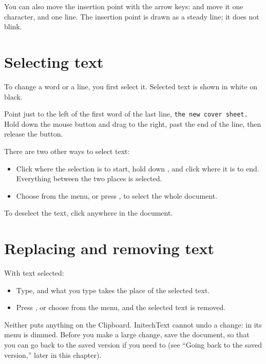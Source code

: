 
You can also move the insertion point with the arrow keys: 
and  move it one character,  and  one line.  The insertion point is drawn as a steady line; it does
not blink.

\section{Selecting text}
To change a word or a line, you first select it.  Selected text is shown
in white on black.
\begin{TaskSteps}
\Step Point just to the left of the first word of the last line,
\texttt{the new cover sheet.}
\Step Hold down the mouse button and drag to the right, past the end of the
line, then release the button.
\end{TaskSteps}


There are two other ways to select text:
\begin{itemize}
\item Click where the selection is to start, hold down , and
  click where it is to end.  Everything between the two places is
  selected.
\item Choose  from the  menu, or press
  , to select the whole document.
\end{itemize}
To deselect the text, click anywhere in the document.

\section{Replacing and removing text}
With text selected:
\begin{itemize}
\item Type, and what you type takes the place of the selected text.
\item Press , or choose  from the
   menu, and the selected text is removed.
\end{itemize}
Neither puts anything on the Clipboard.  InitechText cannot undo a change:
 in its  menu is dimmed.  Before you make a
large change, save the document, so that you can go back to the saved
version if you need to (see ``Going back to the saved version,'' later in
this chapter).

